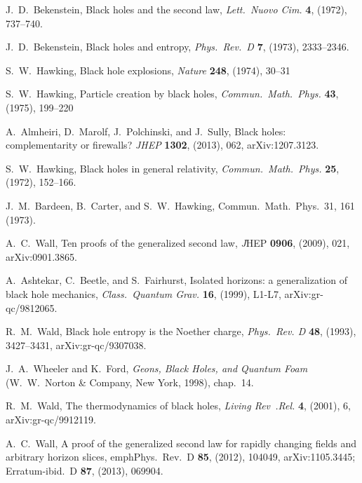 \documentclass[11pt]{article}
\makeatletter
\def\section{\@startsection{section}{1}{\z@}{3.5ex plus 1ex minus
   .2ex}{2.3ex plus .2ex}{\large\bf}}
\makeatother
\begin{document}
 
 
\begin{thebibliography}{999}\addtolength{\itemsep}{-.1ex}
 J.~D.\ Bekenstein, Black holes and the second law,
\emph{Lett.\ Nuovo Cim.} {\bf 4}, (1972), 737--740.

 J.~D.\ Bekenstein, Black holes and entropy,
\emph{Phys.\ Rev.\ D} {\bf 7},   (1973), 2333--2346.

 S.~W.\ Hawking, Black hole explosions,
\emph{Nature} {\bf 248}, (1974), 30--31

  S.~W.\ Hawking, Particle creation by black holes,
\emph{Commun.\ Math.\ Phys.} {\bf 43}, (1975), 199--220

 A.\ Almheiri, D.\ Marolf, J.\ Polchinski, and J.\ Sully,
Black holes: complementarity or firewalls? \emph{JHEP} {\bf 1302},
(2013), 062, arXiv:1207.3123.

 S.~W.\ Hawking,  Black holes in general relativity,
\emph{Commun.\ Math.\ Phys.} {\bf 25}, (1972), 152--166.

 J.\ M.\ Bardeen, B.\ Carter, and S.\ W.\ Hawking, 
 Commun.\ Math.\ Phys.\ 31, 161 (1973).

 A.~C.\ Wall, Ten proofs of the generalized second 
law, {\emph JHEP} {\bf 0906}, (2009), 021, arXiv:0901.3865.

 A.\ Ashtekar, C.\ Beetle, and S.\ Fairhurst,
Isolated horizons: a generalization of black hole mechanics,
\emph{Class.\ Quantum Grav.} {\bf 16}, (1999), L1-L7,
arXiv:gr-qc/9812065.

 R.~M.\ Wald, Black hole entropy is the 
Noether charge, \emph{Phys.\ Rev. D} {\bf 48}, (1993), 
3427--3431, arXiv:gr-qc/9307038.

 J.~A.\ Wheeler and K.\ Ford, \emph{Geons,
Black Holes, and Quantum Foam} (W.~W.~Norton \& Company,
New York, 1998), chap.\ 14.

  R.~M.\ Wald, The thermodynamics of black holes,
\emph{Living Rev\ .Rel.} {\bf 4}, (2001), 6, arXiv:gr-qc/9912119.

  A.~C.\ Wall, A proof of the generalized second 
law for rapidly changing fields and arbitrary horizon slices,
emph{Phys.\ Rev.\ D} {\bf 85}, (2012), 104049,
arXiv:1105.3445; Erratum-ibid.\ D {\bf 87}, (2013), 069904.


\end{thebibliography}
\end{document}
